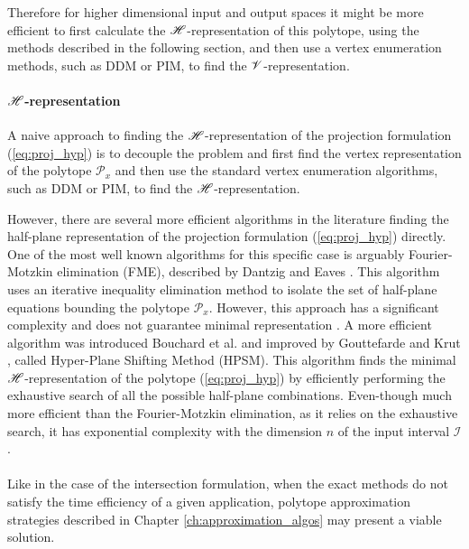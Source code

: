 Therefore for higher dimensional input and output spaces it might be more efficient to first calculate the $\mathscr{H}$-representation  of this polytope, using the methods described in the following section, and then use a vertex enumeration methods, such as DDM\cite{fukuda_dd} or PIM\cite{avis_pivoting_nodate}, to find the $\mathscr{V}$-representation.

\paragraph*{$\mathscr{H}$-representation} A naive approach to finding the $\mathscr{H}$-representation of the projection formulation (\ref{eq:proj_hyp}) is to decouple the problem and first find the vertex representation of the polytope $\mathcal{P}_x$ and then use the standard vertex enumeration algorithms, such as DDM \cite{fukuda_dd} or PIM\cite{avis_pivoting_nodate}, to find the $\mathscr{H}$-representation.

However, there are several more efficient algorithms in the literature finding the half-plane representation of the projection formulation (\ref{eq:proj_hyp}) directly. One of the most well known algorithms for this specific case is arguably Fourier-Motzkin elimination (FME), described by Dantzig and Eaves \cite{dantzig1973fourier}. This algorithm uses an iterative inequality elimination method to isolate the set of half-plane equations bounding the polytope $\mathcal{P}_x$. However, this approach has a significant complexity and does not guarantee minimal representation \cite{Monniaux2010}. 
A more efficient algorithm was introduced Bouchard et al. \cite{Bouchard2009} and improved by Gouttefarde and Krut \cite{hyper_psm}, called Hyper-Plane Shifting Method (HPSM). This algorithm finds the minimal $\mathscr{H}$-representation of the polytope (\ref{eq:proj_hyp}) by efficiently performing the exhaustive search of all the possible half-plane combinations. Even-though much more efficient than the Fourier-Motzkin elimination, as it relies on the exhaustive search, it has exponential complexity with the dimension $n$ of the input interval $\mathcal{I}$.

\paragraph*{}Like in the case of the intersection formulation, when the exact methods do not satisfy the time efficiency of a given application, polytope approximation strategies described in Chapter \ref{ch:approximation_algos} may present a viable solution. 


